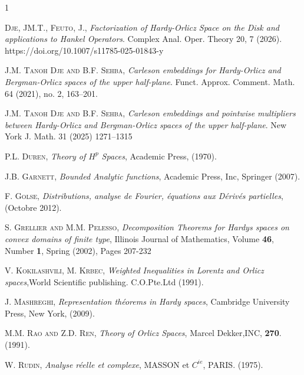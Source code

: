 \documentclass[a4paper,12pt,intlimits,oneside]{amsart}
\theoremstyle{definition}
\numberwithin{equation}{section}
\theoremstyle{definition}
\begin{document}
\begin{thebibliography}{1}
       
       
       
   
       \textsc{Dje, JM.T., Feuto, J.}, \emph{Factorization of Hardy-Orlicz Space on the Disk and applications to Hankel Operators}. Complex Anal. Oper. Theory 20, 7 (2026). https://doi.org/10.1007/s11785-025-01843-y
      
    
 
      \textsc{J.M. Tanoh Dje and B.F. Sehba}, \emph{Carleson embeddings for Hardy-Orlicz and Bergman-Orlicz spaces of the upper half-plane}. Funct. Approx. Comment. Math. 64 (2021), no. 2, 163–201.
 
 
      \textsc{J.M. Tanoh Dje and B.F. Sehba}, \emph{Carleson embeddings and pointwise multipliers between  Hardy-Orlicz and Bergman-Orlicz spaces of the upper half-plane}. New York J. Math. 31 (2025) 1271–1315
 
\textsc{P.L. Duren,}
 \emph{Theory of $H^{p}$ Spaces}, Academic Press, (1970).
 
 

 
 	\textsc{J.B. Garnett}, \emph{Bounded Analytic functions}, Academic Press, Inc, Springer (2007).
 
 
  	\textsc{F. Golse}, \emph{Distributions, analyse de Fourier, \'equations aux D\'eriv\'es partielles},  (Octobre 2012).
  	
 	
 	
     \textsc{S. Grellier and M.M. Pelesso}, \emph{Decomposition Theorems for Hardys spaces on convex domains of finite type}, Illinois Journal of Mathematics, Volume \textbf{46}, Number \textbf{1}, Spring (2002), Pages 207-232
 	
 	

   \textsc{V. Kokilashvili, M. Krbec}, \emph{Weighted Inequalities in Lorentz and Orlicz spaces},World Scientific publishing. C.O.Pte.Ltd (1991).

	
\textsc{J. Mashreghi}, \emph{Representation th\'eorems in Hardy spaces}, Cambridge University Press, New York, (2009).



 	\textsc{M.M. Rao and Z.D. Ren}, \emph{Theory of Orlicz Spaces}, Marcel Dekker,INC, \textbf{270}.(1991).

 	\textsc{W. Rudin}, \emph{Analyse r\'eelle et complexe}, MASSON et $C^{ie}$, PARIS. (1975). 



\end{thebibliography}
\end{document}
